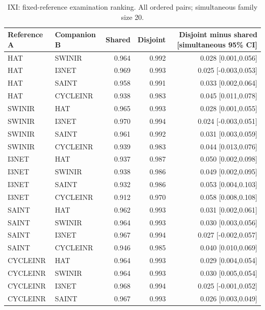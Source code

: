 \begin{table}[t]\centering\small
\caption{IXI: fixed-reference examination ranking. All ordered pairs; simultaneous family size 20.}
\begin{tabular}{llrrr}\toprule Reference A & Companion B & Shared & Disjoint & Disjoint minus shared [simultaneous 95\% CI]\\\midrule
HAT & SWINIR & 0.964 & 0.992 & 0.028 [0.001,0.056] \\
HAT & I3NET & 0.969 & 0.993 & 0.025 [-0.003,0.053] \\
HAT & SAINT & 0.958 & 0.991 & 0.033 [0.002,0.064] \\
HAT & CYCLEINR & 0.938 & 0.983 & 0.045 [0.011,0.078] \\
SWINIR & HAT & 0.965 & 0.993 & 0.028 [0.001,0.055] \\
SWINIR & I3NET & 0.970 & 0.994 & 0.024 [-0.003,0.051] \\
SWINIR & SAINT & 0.961 & 0.992 & 0.031 [0.003,0.059] \\
SWINIR & CYCLEINR & 0.939 & 0.983 & 0.044 [0.013,0.076] \\
I3NET & HAT & 0.937 & 0.987 & 0.050 [0.002,0.098] \\
I3NET & SWINIR & 0.938 & 0.986 & 0.049 [0.002,0.095] \\
I3NET & SAINT & 0.932 & 0.986 & 0.053 [0.004,0.103] \\
I3NET & CYCLEINR & 0.912 & 0.970 & 0.058 [0.008,0.108] \\
SAINT & HAT & 0.962 & 0.993 & 0.031 [0.002,0.061] \\
SAINT & SWINIR & 0.964 & 0.993 & 0.030 [0.003,0.056] \\
SAINT & I3NET & 0.967 & 0.994 & 0.027 [-0.002,0.057] \\
SAINT & CYCLEINR & 0.946 & 0.985 & 0.040 [0.010,0.069] \\
CYCLEINR & HAT & 0.964 & 0.993 & 0.029 [0.004,0.054] \\
CYCLEINR & SWINIR & 0.964 & 0.993 & 0.030 [0.005,0.054] \\
CYCLEINR & I3NET & 0.968 & 0.994 & 0.025 [-0.001,0.052] \\
CYCLEINR & SAINT & 0.967 & 0.993 & 0.026 [0.003,0.049] \\
\bottomrule\end{tabular}\end{table}
